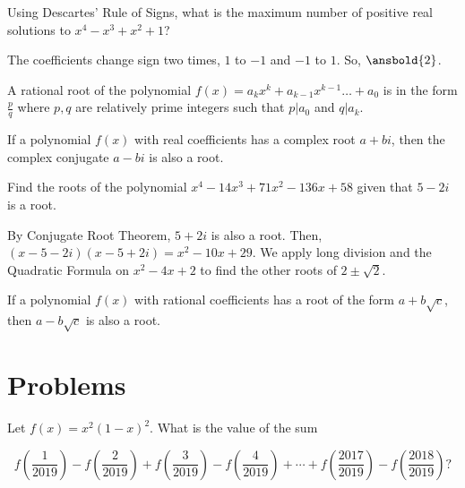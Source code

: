 \documentclass{article}
\begin{document}
\begin{exam}
Using Descartes' Rule of Signs, what is the maximum number of positive real solutions to $x^4-x^3+x^2+1$?
\end{exam}

\begin{sol}
The coefficients change sign two times, $1$ to $-1$ and $-1$ to $1$. So, $\ansbold{2}$.
\end{sol}

\begin{theo}
A rational root of the polynomial $f(x)=a_{k}x^{k}+a_{k-1}x^{k-1}\ldots + a_{0}$ is in the form $\frac{p}{q}$ where $p,q$ are relatively prime integers such that $p|a_{0}$ and $q|a_{k}$.
\end{theo}

\begin{theo}
If a polynomial $f(x)$ with real coefficients has a complex root $a+bi$, then the complex conjugate $a-bi$ is also a root.
\end{theo}

\begin{exam}
Find the roots of the polynomial $x^4-14x^3+71x^2-136x+58$ given that $5-2i$ is a root.
\end{exam}

\begin{sol}
By Conjugate Root Theorem, $5+2i$ is also a root. Then, $(x-5-2i)(x-5+2i)=x^2-10x+29$. We apply long division and the Quadratic Formula on $x^2-4x+2$ to find the other roots of $2\pm \sqrt{2}$.
\end{sol}


\begin{theo}
If a polynomial $f(x)$ with rational coefficients has a root of the form $a+b\sqrt{c}$, then $a-b\sqrt{c}$ is also a root.
\end{theo}

\newpage
\section{Problems}



\begin{prob}[AMC 12B 2019/8]{1}

Let $f(x) = x^{2}(1-x)^{2}$. What is the value of the sum

\[f \left(\frac{1}{2019} \right)-f  \left(\frac{2}{2019} \right)+f \left(\frac{3}{2019} \right)-f \left(\frac{4}{2019} \right)+\cdots + f \left(\frac{2017}{2019} \right) - f \left(\frac{2018}{2019} \right)?\]
\end{prob}
\end{document}
